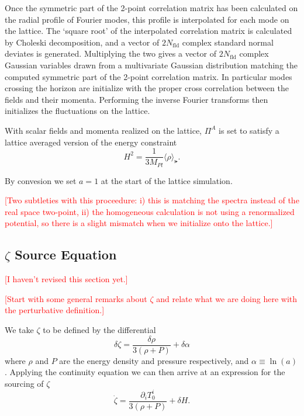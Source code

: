 Once the symmetric part of the 2-point correlation matrix has been calculated on the radial profile of Fourier modes, this profile is interpolated for each mode on the lattice. The `square root' of the interpolated correlation matrix is calculated by Choleski decomposition, and a vector of $2N_\mathrm{fld}$ complex standard normal deviates is generated. Multiplying the two gives a vector of $2N_\mathrm{fld}$ complex Gaussian variables drawn from a multivariate Gaussian distribution matching the computed symmetric part of the 2-point correlation matrix. In particular modes crossing the horizon are initialize with the proper cross correlation between the fields and their momenta.  Performing the inverse Fourier transforms then initializes the fluctuations on the lattice.

With scalar fields and momenta realized on the lattice, $\Pi^A$ is set to satisfy a lattice averaged version of the energy constraint
\begin{equation} \label{eq:energy constraint}
  H^2 = \frac{1}{3M_{Pl}}\langle \rho \rangle_\lat.
\end{equation}

By convesion we set $a=1$ at the start of the lattice simulation.

\textcolor{red}{[Two subtleties with this proceedure: i) this is matching the spectra instead of the real space two-point, ii) the homogeneous calculation is not using a renormalized potential, so there is a slight mismatch when we initialize onto the lattice.]}

\subsection{$\zeta$ Source Equation} \label{sec:zeta source}
\textcolor{red}{[I haven't revised this section yet.]}

\textcolor{red}{[Start with some general remarks about $\zeta$ and relate what we are doing here with the perturbative definition.]}

We take $\zeta$ to be defined by the differential
\begin{equation} \label{eq:zeta differential}
  \delta\zeta = \frac{\delta\rho}{3(\rho + P)} + \delta\alpha
\end{equation} 
where $\rho$ and $P$ are the energy density and pressure respectively, and $\alpha \equiv \ln(a)$.
Applying the continuity equation we can then arrive at an expression for the sourcing of $\zeta$
\begin{equation} \label{eq:zeta source T}
  \dot{\zeta} = \frac{\partial_iT^i_0}{3(\rho+P)} + \delta H. %
\end{equation}


